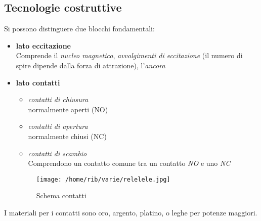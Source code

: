 \documentclass{article}
\begin{document}
\subsection{Tecnologie costruttive}
Si possono  distinguere due blocchi fondamentali:
\begin{itemize}
    \item \textbf{lato eccitazione}\\
    Comprende il \emph{nucleo magnetico}, \emph{avvolgimenti di eccitazione} (il numero di spire dipende dalla forza di attrazione), l'\emph{ancora} 
    \item \textbf{lato contatti}\\
    \begin{itemize}
        \item \textit{contatti di chiusura}\\
        normalmente aperti (NO)
        \item \textit{contatti di apertura}\\
        normalmente chiusi (NC)
        \item \textit{contatti di scambio}\\
        Comprendono un contatto comune tra un contatto \emph{NO} e uno \emph{NC}
    \end{itemize}

    \begin{figure}[H]
        \texttt{[image: /home/rib/varie/relelele.jpg]}
        \caption{Schema contatti}
        \label{contatt}
     \end{figure}

\end{itemize}
I materiali per i contatti sono oro, argento, platino, o leghe per potenze maggiori.
\end{document}
